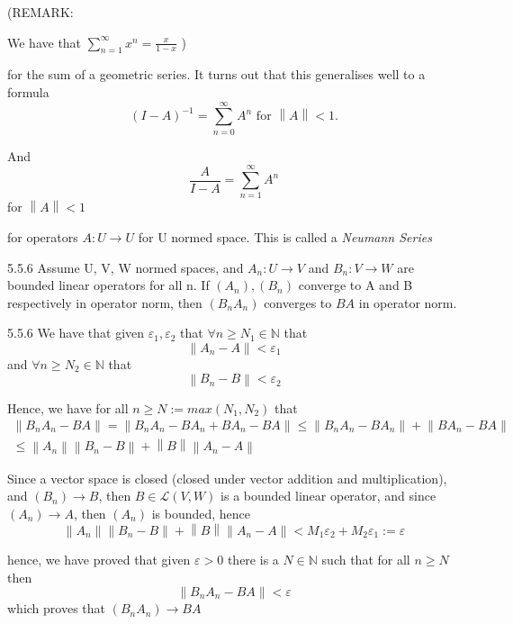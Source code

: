 \documentclass[a4paper,norsk]{article}
\renewcommand{\geq}{\geqslant}
\renewcommand{\leq}{\leqslant}
\renewcommand{\epsilon}{\varepsilon}
\begin{document}
(REMARK:

We have that $ \sum_{n=1}^{\infty} x^n = \frac{ x }{ 1-x }   $ 
)


for the sum of a geometric series. It turns out that this generalises well to a formula
\[
    \left( I - A \right) ^{-1} = \sum_{n=0}^{\infty} A ^{n} \text{ for } \left\lVert A \right\rVert < 1.
\]

And
\[
    \frac{ A }{ I - A } = \sum_{n=1}^{\infty} A^n  
\]
for $ \left\lVert A \right\rVert < 1 $ 


for operators $ A : U \to U $ for U normed space. This is called a \textit{Neumann Series}

\begin{lemmabox}{5.5.6}{}
Assume U, V, W normed spaces, and $ A_n : U \to V $ and $ B_n : V \to W $ are bounded linear operators for all n. If $ \left( A_n \right), \left( B_n \right)   $ converge to A and B respectively in operator norm, then $ \left( B_n A_n \right)  $ converges to $ BA $ in operator norm.

\begin{proofbox}{5.5.6}{}
    We have that given $ \epsilon _1, \epsilon _2 $ that $ \forall n \geq N_1 \in \mathbb{N} $ that
    \[
        \left\lVert A_n - A \right\rVert < \epsilon _1 
    \]
    and $ \forall n \geq N_2 \in \mathbb{N} $ that
    \[
        \left\lVert B_n - B \right\rVert < \epsilon _2
    \]

    Hence, we have for all $ n \geq N := max(N_1, N_2) $ that 
    \begin{align*}
        \left\lVert B_nA_n - BA \right\rVert = \left\lVert B_nA_n - BA_n + BA_n - BA \right\rVert \leq \left\lVert B_nA_n - BA_n \right\rVert + \left\lVert BA_n - BA \right\rVert \\
        \leq  \left\lVert A_n \right\rVert \left\lVert B_n - B \right\rVert + \left\lVert B \right\rVert \left\lVert A_n - A \right\rVert
    \end{align*}
    
    Since a vector space is closed (closed under vector addition and multiplication), and $ \left( B_n \right) \to B  $, then $ B \in \mathcal{L} \left( V, W \right)  $ is a bounded linear operator, and since $ \left( A_n \right) \to A  $, then $ \left( A_n \right)  $ is bounded, hence 
    \[
        \left\lVert A_n \right\rVert \left\lVert B_n - B \right\rVert + \left\lVert B \right\rVert \left\lVert A_n - A \right\rVert < M_1 \epsilon _2 + M_2 \epsilon _1 := \epsilon 
    \]

    hence, we have proved that given $ \epsilon > 0 $ there is a $ N \in \mathbb{N} $ such that for all $ n \geq N $ then
    \[
        \left\lVert B_nA_n - BA \right\rVert < \epsilon 
    \]
    which proves that $ \left( B_n A_n \right) \to BA  $ 
\end{proofbox}
\end{lemmabox}
\end{document}
